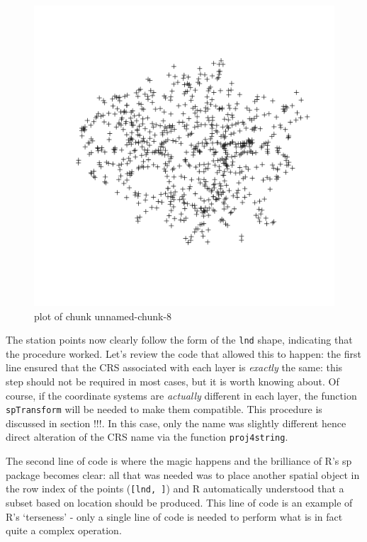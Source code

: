 \documentclass[]{article}
\makeatletter
\def\maxwidth{\ifdim\Gin@nat@width>\linewidth\linewidth
\else\Gin@nat@width\fi}
\let\Oldincludegraphics\includegraphics
\renewcommand{\includegraphics}[1]{\Oldincludegraphics[width=\maxwidth]{#1}}
\makeatother
\begin{document}
\begin{figure}[htbp]
\centering
\includegraphics{figure/unnamed-chunk-8.png}
\caption{plot of chunk unnamed-chunk-8}
\end{figure}

The station points now clearly follow the form of the \texttt{lnd}
shape, indicating that the procedure worked. Let's review the code that
allowed this to happen: the first line ensured that the CRS associated
with each layer is \emph{exactly} the same: this step should not be
required in most cases, but it is worth knowing about. Of course, if the
coordinate systems are \emph{actually} different in each layer, the
function \texttt{spTransform} will be needed to make them compatible.
This procedure is discussed in section !!!. In this case, only the name
was slightly different hence direct alteration of the CRS name via the
function \texttt{proj4string}.

The second line of code is where the magic happens and the brilliance of
R's sp package becomes clear: all that was needed was to place another
spatial object in the row index of the points (\texttt{{[}lnd, {]}}) and
R automatically understood that a subset based on location should be
produced. This line of code is an example of R's `terseness' - only a
single line of code is needed to perform what is in fact quite a complex
operation.
\end{document}

